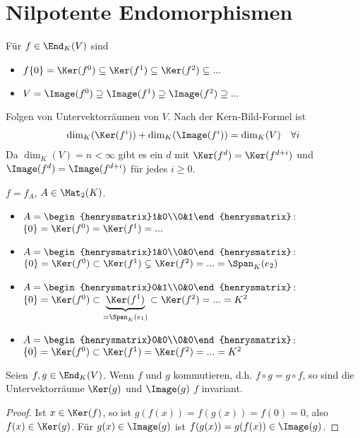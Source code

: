 \section{Nilpotente Endomorphismen}

\begin{remark}
	Für $f\in\End_K(V)$ sind 
	\begin{itemize}
		\item $f\{0\}=\Ker(f^0)\subseteq \Ker(f^1)\subseteq \Ker(f^2)\subseteq ...$
		\item $V=\Image(f^0)\supseteq \Image(f^1)\supseteq \Image(f^2)\supseteq ...$
	\end{itemize}
Folgen von Untervektorräumen von $V$. Nach der Kern-Bild-Formel  ist
\begin{align}
	\dim_K(\Ker(f^i))+\dim_K(\Image(f^i))=\dim_K(V)\quad\forall i\notag
\end{align}
Da $\dim_K(V)=n<\infty$ gibt es ein $d$ mit $\Ker(f^d)=\Ker(f^{d+i})$ und $\Image(f^d)=\Image(f^{d+i})$ für jedes $i\ge 0$.
\end{remark}

\begin{example}
	$f=f_A$, $A\in\Mat_2(K)$.
	\begin{itemize}
		\item $A=\begin{henrysmatrix}1&0\\0&1\end{henrysmatrix}$: $\{0\}=\Ker(f^0)=\Ker(f^1)=...$
		\item $A=\begin{henrysmatrix}1&0\\0&0\end{henrysmatrix}$: $\{0\}=\Ker(f^0)\subset\Ker(f^1)\subsetneq\Ker(f^2)=...=\Span_K(e_2)$
		\item $A=\begin{henrysmatrix}0&1\\0&0\end{henrysmatrix}$: $\{0\}=\Ker(f^0)\subset\underbrace{\Ker(f^1)}_{=\Span_K(e_1)}\subset \Ker(f^2)=... = K^2$
		\item $A=\begin{henrysmatrix}0&0\\0&0\end{henrysmatrix}$: $\{0\}=\Ker(f^0)\subset\Ker(f^1)=\Ker(f^2)=...=K^2$
	\end{itemize}
\end{example}

\begin{lemma}
	Seien $f,g\in\End_K(V)$. Wenn $f$ und  $g$ kommutieren, d.h. $f\circ g=g\circ f$, so sind die Untervektorräume $\Ker(g)$ und $\Image(g)$ $f$ invariant.
\end{lemma}
\begin{proof}
	Ist $x\in\Ker(f)$, so ist $g(f(x))=f(g(x))=f(0)=0$, also $f(x)\in\Ker(g)$. Für $g(x)\in\Image(g)$ ist $f(g(x))=g(f(x))\in\Image(g)$.
\end{proof}

